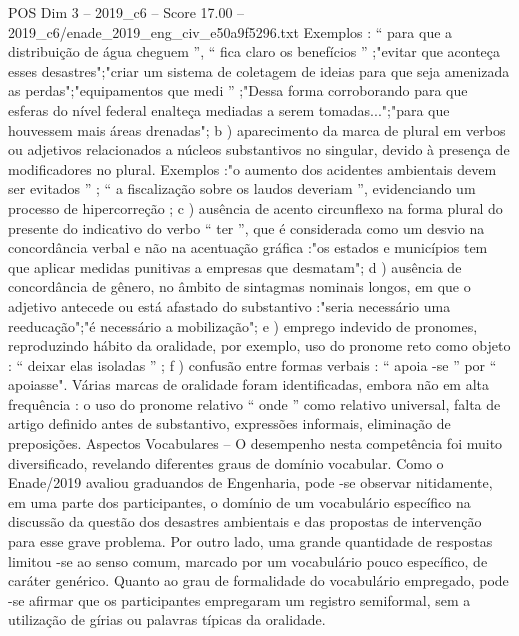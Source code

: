 \begin{textsample}{POS Dim 3 – 2019\_c6 – Score 17.00 – 2019\_c6/enade\_2019\_eng\_civ\_e50a9f5296.txt}
Exemplos : “ para que a distribuição de água cheguem ”, “ fica claro os benefícios ” ;"evitar que aconteça esses desastres";"criar um sistema de coletagem de ideias para que seja amenizada as perdas";"equipamentos que medi ” ;"Dessa forma corroborando para que esferas do nível federal enalteça mediadas a serem tomadas...";"para que houvessem mais áreas drenadas"; b ) aparecimento da marca de plural em verbos ou adjetivos relacionados a núcleos substantivos no singular, devido à presença de modificadores no plural.
Exemplos :"o aumento dos acidentes ambientais devem ser evitados ” ; “ a fiscalização sobre os laudos deveriam ”, evidenciando um processo de hipercorreção ; c ) ausência de acento circunflexo na forma plural do presente do indicativo do verbo “ ter ”, que é considerada como um desvio na concordância verbal e não na acentuação gráfica :"os estados e municípios tem que aplicar medidas punitivas a empresas que desmatam"; d ) ausência de concordância de gênero, no âmbito de sintagmas nominais longos, em que o adjetivo antecede ou está afastado do substantivo :"seria necessário uma reeducação";"é necessário a mobilização"; e ) emprego indevido de pronomes, reproduzindo hábito da oralidade, por exemplo, uso do pronome reto como objeto : “ deixar elas isoladas ” ; f ) confusão entre formas verbais : “ apoia -se ” por “ apoiasse".
Várias marcas de oralidade foram identificadas, embora não em alta frequência : o uso do pronome relativo “ onde ” como relativo universal, falta de artigo definido antes de substantivo, expressões informais, eliminação de preposições.
Aspectos Vocabulares – O desempenho nesta competência foi muito diversificado, revelando diferentes graus de domínio vocabular.
Como o Enade/2019 avaliou graduandos de Engenharia, pode -se observar nitidamente, em uma parte dos participantes, o domínio de um vocabulário específico na discussão da questão dos desastres ambientais e das propostas de intervenção para esse grave problema.
Por outro lado, uma grande quantidade de respostas limitou -se ao senso comum, marcado por um vocabulário pouco específico, de caráter genérico.
Quanto ao grau de formalidade do vocabulário empregado, pode -se afirmar que os participantes empregaram um registro semiformal, sem a utilização de gírias ou palavras típicas da oralidade.

\end{textsample}
